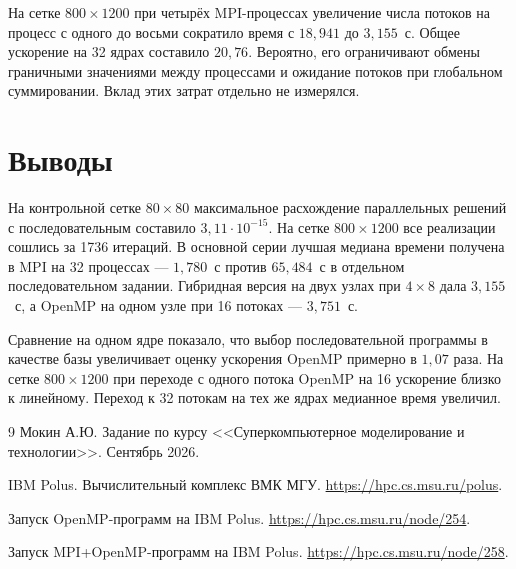 \documentclass[a4paper,12pt]{extarticle}
\begin{document}
На сетке $800\times1200$ при четырёх MPI-процессах увеличение числа потоков на процесс с одного до восьми сократило время с $18{,}941$ до $3{,}155$~с. Общее ускорение на 32 ядрах составило $20{,}76$. Вероятно, его ограничивают обмены граничными значениями между процессами и ожидание потоков при глобальном суммировании. Вклад этих затрат отдельно не измерялся.

\section{Выводы}

На контрольной сетке $80\times80$ максимальное расхождение параллельных решений с последовательным составило $3{,}11\cdot10^{-15}$. На сетке $800\times1200$ все реализации сошлись за 1736 итераций. В основной серии лучшая медиана времени получена в MPI на 32 процессах --- $1{,}780$~с против $65{,}484$~с в отдельном последовательном задании. Гибридная версия на двух узлах при $4\times8$ дала $3{,}155$~с, а OpenMP на одном узле при 16 потоках --- $3{,}751$~с.

Сравнение на одном ядре показало, что выбор последовательной программы в качестве базы увеличивает оценку ускорения OpenMP примерно в $1{,}07$ раза. На сетке $800\times1200$ при переходе с одного потока OpenMP на 16 ускорение близко к линейному. Переход к 32 потокам на тех же ядрах медианное время увеличил.

\begin{thebibliography}{9}
    Мокин А.Ю. Задание по курсу <<Суперкомпьютерное моделирование и технологии>>. Сентябрь 2026.

    IBM Polus. Вычислительный комплекс ВМК МГУ.
    \url{https://hpc.cs.msu.ru/polus}.

    Запуск OpenMP-программ на IBM Polus.
    \url{https://hpc.cs.msu.ru/node/254}.

    Запуск MPI+OpenMP-программ на IBM Polus.
    \url{https://hpc.cs.msu.ru/node/258}.
\end{thebibliography}
\end{document}
